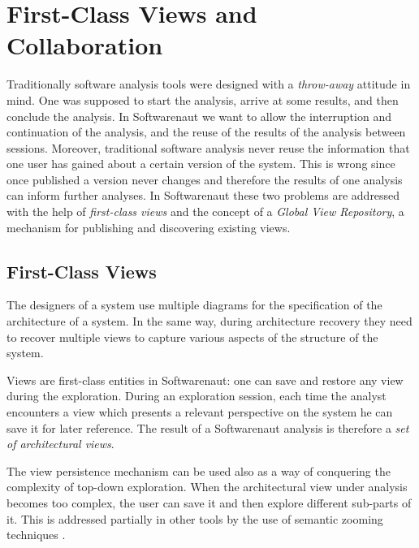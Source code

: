 \documentclass[preprint,12pt]{elsarticle}
\begin{document}
\section {First-Class Views and Collaboration} 

Traditionally software analysis tools were designed with a {\em throw-away} attitude  in mind. One was supposed to start the analysis, arrive at some results, and then conclude the analysis. In Softwarenaut we want to allow the interruption and continuation of the analysis, and the reuse of the results of the analysis between sessions. Moreover, traditional software analysis never reuse the information that one user has gained about a certain version of the system. This is wrong since once published a version never changes and therefore the results of one analysis can inform further analyses. In Softwarenaut these two problems are addressed with the help of {\em first-class views} and the concept of a {\em Global View Repository}, a mechanism for publishing and discovering existing views.

\subsection {First-Class Views}

The designers of a system use multiple diagrams for the specification of the architecture of a system. In the same way, during architecture recovery they need to recover multiple views to capture various aspects of the structure of the system. 

Views are first-class entities in Softwarenaut: one can save and restore any view during the exploration. During an exploration session, each time the analyst encounters a view which presents a relevant perspective on the system he can save it for later reference. The result of a Softwarenaut analysis is therefore a {\em set of architectural views}.

The view persistence mechanism can be used also as a way of conquering the complexity of top-down exploration. When the architectural view under analysis becomes too complex, the user can save it and then explore different sub-parts of it. This is addressed partially in other tools by the use of semantic zooming techniques \cite{storey-shrimp}. 
\end{document}
